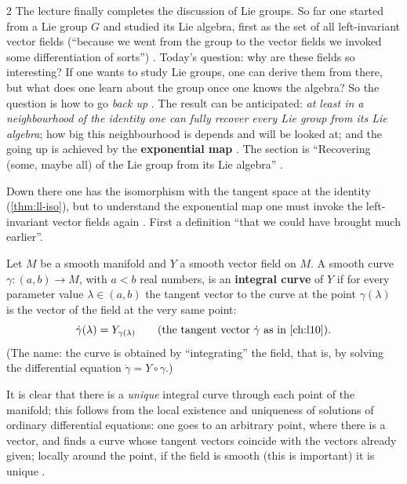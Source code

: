 \begin{paracol}{2}
The lecture finally completes the discussion of Lie groups. So far one started from a Lie group $G$ and studied its Lie algebra, first as the set of all left-invariant vector fields (``because we went from the group to the vector fields we invoked some differentiation of sorts'')  . Today's question: why are these fields so interesting? If one wants to study Lie groups, one can derive them from there, but what does one learn about the group once one knows the algebra? So the question is how to go \emph{back up} . The result can be anticipated: \emph{at least in a neighbourhood of the identity one can fully recover every Lie group from its Lie algebra}; how big this neighbourhood is depends and will be looked at; and the going up is achieved by the \textbf{exponential map}  . The section is ``Recovering (some, maybe all) of the Lie group from its Lie algebra'' .

Down there one has the isomorphism with the tangent space at the identity (\cref{thm:ll-iso}), but to understand the exponential map one must invoke the left-invariant vector fields again . First a definition ``that we could have brought much earlier''.
\begin{definition}\label{def:rc-integral}
Let $M$ be a smooth manifold and $Y$ a smooth vector field on $M$. A smooth curve $\gamma\colon(a,b)\to M$, with $a<b$ real numbers, is an \textbf{integral curve} of $Y$ if for every parameter value $\lambda\in(a,b)$ the tangent vector to the curve at the point $\gamma(\lambda)$ is the vector of the field at the very same point:
\[
  \dot\gamma(\lambda)=Y_{\gamma(\lambda)}\qquad(\text{the tangent vector }\dot\gamma\text{ as in \cref{ch:l10}}).
\]
(The name: the curve is obtained by ``integrating'' the field, that is, by solving the differential equation $\dot\gamma=Y\circ\gamma$.)     
\end{definition}
It is clear that there is a \emph{unique} integral curve through each point of the manifold; this follows from the local existence and uniqueness of solutions of ordinary differential equations: one goes to an arbitrary point, where there is a vector, and finds a curve whose tangent vectors coincide with the vectors already given; locally around the point, if the field is smooth (this is important) it is unique     .


\end{paracol}

